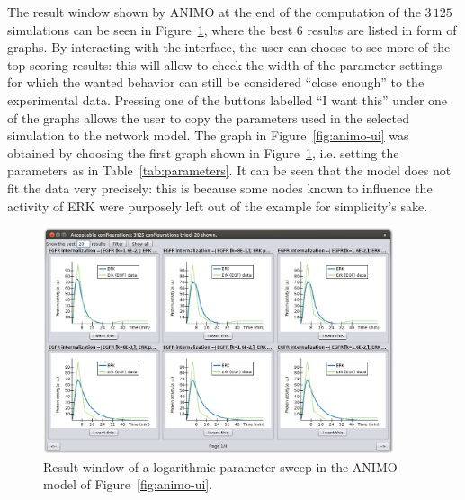 \documentclass[submission,copyright,creativecommons]{eptcs}
\begin{document}
The result window shown by ANIMO at the end of the computation of the $3\,125$ simulations can
be seen in Figure~\ref{fig:parameter-sweep-result}, where the best 6 results are listed in form of graphs.
By interacting with the interface, the user can choose to see more of the top-scoring results: this will allow to check
the width of the parameter settings for which the wanted behavior can still be considered ``close enough'' to
the experimental data. Pressing one of the buttons labelled ``I want this'' under one of the graphs
allows the user to copy the parameters used in the selected simulation to the network model.
The graph in Figure~\ref{fig:animo-ui} was obtained by choosing the first graph shown in Figure~\ref{fig:parameter-sweep-result},
i.e. setting the parameters as in Table~\ref{tab:parameters}. It can be seen that the model does not
fit the data very precisely: this is because some nodes known to influence the activity of ERK
were purposely left out of the example for simplicity's sake.



\begin{figure}
\centering
\includegraphics[width=0.92\textwidth]{images/parameter_sweep_results}
\caption{Result window of a logarithmic parameter sweep in the ANIMO model of Figure~\ref{fig:animo-ui}.\label{fig:parameter-sweep-result}}
\end{figure}
\end{document}
